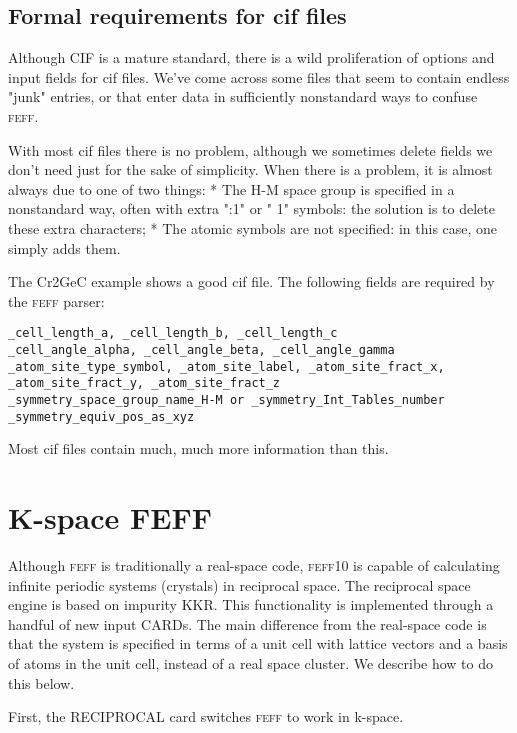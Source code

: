 \documentclass[11pt,oneside]{report} %
\newcommand{\feffcurrent}{\textsc{feff10}}
\newcommand{\program}[1]{\textsc{#1}}
\newcommand{\feff}{\program{feff}}
\begin{document}
\subsection{Formal requirements for cif files}
Although CIF is a mature standard, there is a wild proliferation of options and input fields for cif files.  We've come across some files that seem to contain endless "junk" entries, or that enter data in sufficiently nonstandard ways to confuse {\feff}.

With most cif files there is no problem, although we sometimes delete fields we don't need just for the sake of simplicity.  When there is a problem, it is almost always due to one of two things:
* The H-M space group is specified in a nonstandard way, often with extra ":1" or " 1" symbols: the solution is to delete these extra characters;
* The atomic symbols are not specified: in this case, one simply adds them.

The Cr2GeC example shows a good cif file.  The following fields are required by the {\feff} parser:
\begin{verbatim}_cell_length_a, _cell_length_b, _cell_length_c
_cell_angle_alpha, _cell_angle_beta, _cell_angle_gamma
_atom_site_type_symbol, _atom_site_label, _atom_site_fract_x, _atom_site_fract_y, _atom_site_fract_z
_symmetry_space_group_name_H-M or _symmetry_Int_Tables_number
_symmetry_equiv_pos_as_xyz \end{verbatim}

Most cif files contain much, much more information than this.



\section{K-space FEFF}
\label{sec:kspace}

Although {\feff} is traditionally a real-space code, {\feffcurrent} is capable of calculating infinite periodic systems (crystals) in
reciprocal space.  The reciprocal space engine is based on impurity KKR.  This functionality is implemented through a handful of new input CARDs.  The main difference from the real-space code is that the system is specified in terms of a unit cell with lattice vectors and a basis of atoms in the unit cell, instead of a real space cluster.  We  describe how to do this below.

First, the RECIPROCAL card switches {\feff} to work in k-space.  
\end{document}

